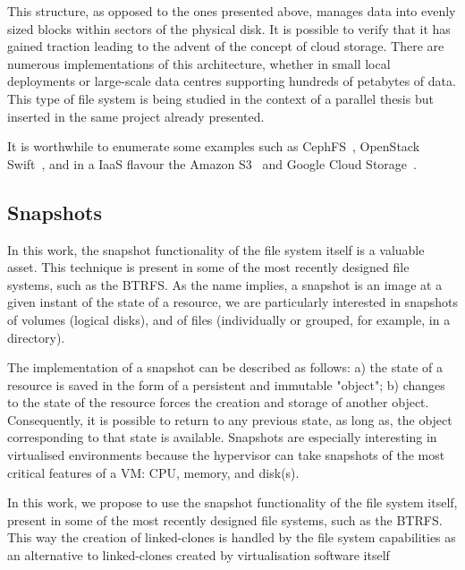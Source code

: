 This structure, as opposed to the ones presented above, manages data into evenly sized blocks within sectors of the physical disk. It is possible to verify that it has gained traction leading to the advent of the concept of cloud storage. There are numerous implementations of this architecture, whether in small local deployments or large-scale data centres supporting hundreds of petabytes of data.
This type of file system is being studied in the context of a parallel thesis but inserted in the same project already presented.

It is worthwhile to enumerate some examples such as CephFS~\cite{Weil2006}, OpenStack Swift~\cite{Swift2017}, and in a IaaS flavour the Amazon S3~\cite{aws_s3} and Google Cloud Storage~\cite{gcp_storage}.


\subsection{Snapshots} %
\label{sub:res_snapshots}

In this work, the snapshot functionality of the file system itself is a valuable asset. This technique is present in some of the most recently designed file systems, such as the BTRFS. 
As the name implies, a snapshot is an image at a given instant of the state of a resource,  we are particularly interested in snapshots of volumes (logical disks), and of files (individually or grouped, for example, in a directory).

The implementation of a snapshot can be described as follows: a) the state of a resource is saved in the form of a persistent and immutable "object"; b) changes to the state of the resource forces the creation and storage of another object. Consequently, it is possible to return to any previous state, as long as, the object corresponding to that state is available. Snapshots are especially interesting in virtualised environments because the hypervisor can take snapshots of the most critical features of a VM: CPU, memory, and disk(s). 

In this work, we propose to use the snapshot functionality of the file system itself, present in some of the most recently designed file systems, such as the BTRFS. This way the creation of linked-clones is handled by the file system capabilities as an alternative to linked-clones created by virtualisation software itself

